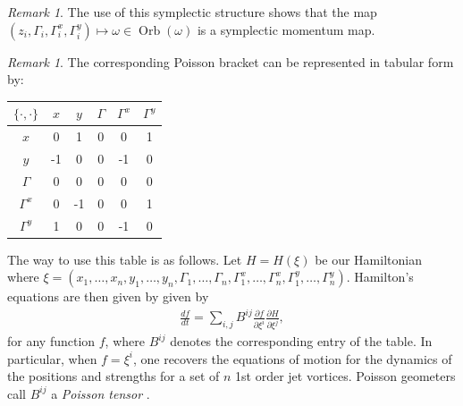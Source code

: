 \documentclass[12pt]{amsart}
\newcommand{\pder}[2]{\ensuremath{\frac{ \partial #1}{\partial #2}}}
\theoremstyle{remark}
\newtheorem{rmk}[thm]{Remark}
\DeclareMathOperator{\Orb}{Orb}
\begin{document}
\begin{rmk}
  The use of this symplectic structure shows that the map $(z_i, \Gamma_i,\Gamma_i^x,\Gamma_i^y) \mapsto \omega \in \Orb(\omega)$ is a symplectic momentum map.
\end{rmk}

\begin{rmk}
The corresponding Poisson bracket can be represented in tabular form by:
\begin{center}
\begin{tabular}{|c|c|c|c|c|c|}
\hline
	$\{ \cdot , \cdot \}$ & $x$ & $y$ & $\Gamma$ & $\Gamma^x$  & $\Gamma^y$ \\ \hline
	$x$ & 0 & 1 & 0 & 0 & 1 \\ \hline
	$y$ & -1 & 0 & 0 & -1 & 0 \\ \hline 
	$\Gamma$ & 0 & 0 & 0 & 0 & 0 \\ \hline
	$\Gamma^x$ & 0 & -1 & 0 & 0 & 1 \\ \hline
	$\Gamma^y$ & 1 & 0 & 0 & -1 & 0  \\ \hline
\end{tabular}
\end{center}

The way to use this table is as follows.  Let $H = H(\xi)$ be our Hamiltonian where
$\xi = (x_1,\dots,x_n,y_1,\dots,y_n,\Gamma_1,\dots,\Gamma_n,\Gamma_1^x,\dots,\Gamma_n^x,\Gamma_1^y,\dots,\Gamma_n^y)$.
Hamilton's equations are then given by
given by
\begin{align*}
	\frac{df}{dt} = \sum_{i,j} B^{ij} \pder{f}{\xi^i} \pder{H}{\xi^j},
\end{align*}
for any function $f$, where $B^{ij}$ denotes the corresponding entry of the table.
In particular, when $f=\xi^i$, one recovers the equations of motion for the dynamics
of the positions and strengths for a set of $n$ 1st order jet vortices. 
Poisson geometers call $B^{ij}$ a \emph{Poisson tensor} \cite{FOM}.
\end{rmk}
\end{document}
